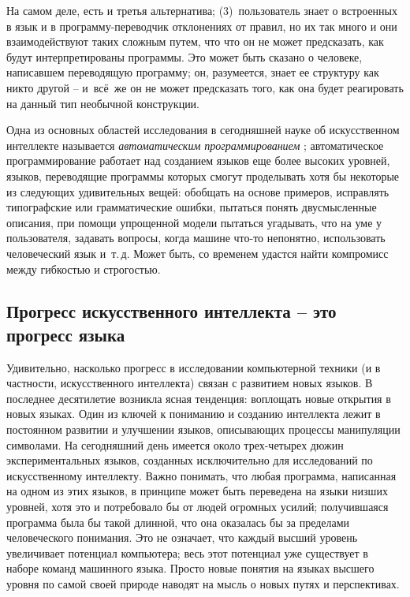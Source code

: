 \documentclass[../main.tex]{subfiles}
\begin{document}
На самом деле, есть и третья альтернатива; (3)~пользователь знает о встроенных в язык и в программу-переводчик отклонениях от правил, но их так много и они взаимодействуют таких сложным путем, что что он не может предсказать, как будут интерпретированы программы. Это может быть сказано о человеке, написавшем переводящую программу; он, разумеется, знает ее структуру как никто другой \--- и~всё~же он не может предсказать того, как она будет реагировать на данный тип необычной конструкции.

Одна из основных областей исследования в сегодняшней науке об искусственном интеллекте называется \emph{автоматическим программированием} ; автоматическое программирование работает над созданием языков еще более высоких уровней, языков, переводящие программы которых смогут проделывать хотя бы некоторые из следующих удивительных вещей: обобщать на основе примеров, исправлять типографские или грамматические ошибки, пытаться понять двусмысленные описания, при помощи упрощенной модели пытаться угадывать, что на уме у пользователя, задавать вопросы, когда машине что-то непонятно, использовать человеческий язык и~т.\,д. Может быть, со временем удастся найти компромисс между гибкостью и строгостью.


\subsection{Прогресс искусственного интеллекта \--- это прогресс языка}

Удивительно, насколько прогресс в исследовании компьютерной техники (и в частности, искусственного интеллекта) связан с развитием новых языков. В последнее десятилетие возникла ясная тенденция: воплощать новые открытия в новых языках. Один из ключей к пониманию и созданию интеллекта лежит в постоянном развитии и улучшении языков, описывающих процессы манипуляции символами. На сегодняшний день имеется около трех-четырех дюжин экспериментальных языков, созданных исключительно для исследований по искусственному интеллекту. Важно понимать, что любая программа, написанная на одном из этих языков, в принципе может быть переведена на языки низших уровней, хотя это и потребовало бы от людей огромных усилий; получившаяся программа была бы такой длинной, что она оказалась бы за пределами человеческого понимания. Это не означает, что каждый высший уровень увеличивает потенциал компьютера; весь этот потенциал уже существует в наборе команд машинного языка. Просто новые понятия на языках высшего уровня по самой своей природе наводят на мысль о новых путях и перспективах.
\end{document}
